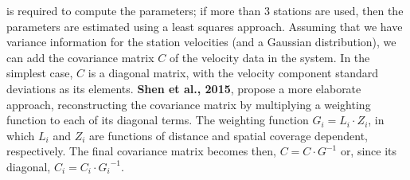 \documentclass[landscape,a0paper,fontscale=0.324]{baposter} %
\begin{document}
\begin{poster}
{is required to compute the parameters; if more than 3 stations are used, then
the parameters are estimated using a least squares approach.
Assuming that we have variance information for the station velocities (and a Gaussian distribution),
we can add the covariance matrix \(C\) of the velocity data in the system.
In the simplest case, \(C\) is a diagonal matrix, with the velocity component
standard deviations as its elements.
\textbf{Shen et al., 2015}, propose a more elaborate approach, reconstructing the
covariance matrix by multiplying a weighting function to each of its diagonal terms.
The weighting function \(G_i = L_i \cdot Z_i\), in which \(L_i\) and \(Z_i\)
are functions of distance and spatial coverage dependent, respectively.
The final covariance matrix becomes then, \(C = C \cdot G^{-1}\) or, since its diagonal,
\(C_i = C_i \cdot {G_i}^{-1}\).
}


\end{poster}
\end{document}
